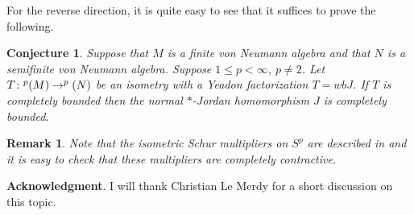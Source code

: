 \documentclass[leqno]{article} %
\let\L\relax
\newcommand{\L}{\mathrm{L}}
\renewcommand{\leq}{\ensuremath{\leqslant}}
\newcommand{\co}{\colon}
\newtheorem{conj}[thm]{Conjecture}
\newtheorem{remark}[thm]{Remark}
\numberwithin{equation}{section}
\begin{document}


For the reverse direction, it is quite easy to see that it suffices to prove the following.

\begin{conj}
\label{Conj-fundamental}
Suppose that $M$ is a finite von Neumann algebra and that $N$ is a semifinite von Neumann algebra. Suppose $1 \leq p< \infty$, $p \not=2$. Let $T \co \L^p(M) \to \L^p(N)$ be an isometry with a Yeadon factorization $T=wbJ$. If $T$ is completely bounded then the normal $*$-Jordan homomorphism $J$ is completely bounded.
\end{conj}

\begin{remark} \normalfont
Note that the isometric Schur multipliers on $S^p$ are described in \cite{Arh3} and it is easy to check that these multipliers are completely contractive. 
\end{remark}


\textbf{Acknowledgment}.
I will thank Christian Le Merdy for a short discussion on this topic.
\end{document}
